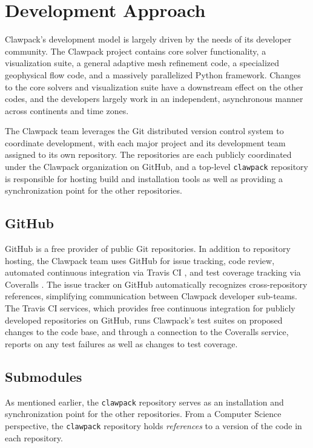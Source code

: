 %
%
%

\section{Development Approach}

Clawpack's development model is largely driven by the needs of its
developer community.  The Clawpack project contains core solver
functionality, a visualization suite, a general adaptive mesh
refinement code, a specialized geophysical flow code, and a
massively parallelized Python framework.  Changes to the core solvers
and visualization suite have a downstream effect on the other codes,
and the developers largely work in an independent, asynchronous manner
across continents and time zones. 

The Clawpack team leverages the Git distributed version control system
to coordinate development, with each major project and its development
team assigned to its own repository.  The repositories are each
publicly coordinated under the Clawpack organization on GitHub, and a
top-level \texttt{clawpack} repository is responsible for hosting
build and installation tools as well as providing a synchronization
point for the other repositories.

\subsection{GitHub}

GitHub is a free provider of public Git repositories.  In addition to
repository hosting, the Clawpack team uses GitHub for issue tracking,
code review, automated continuous integration via Travis CI \cite{travis}, 
and test coverage tracking via Coveralls \cite{coveralls}.  
The issue tracker on GitHub
automatically recognizes cross-repository references, simplifying
communication between Clawpack developer sub-teams.  The Travis CI
services, which provides free continuous integration for publicly
developed repositories on GitHub, runs Clawpack's test suites on
proposed changes to the code base, and through a connection to
the Coveralls service, reports on any test failures as well as changes
to test coverage.

\subsection{Submodules}

As mentioned earlier, the \texttt{clawpack} repository serves as an
installation and synchronization point for the other repositories.
From a Computer Science perspective, the \texttt{clawpack} repository
holds \textit{references} to a version of the code in each
repository.  

